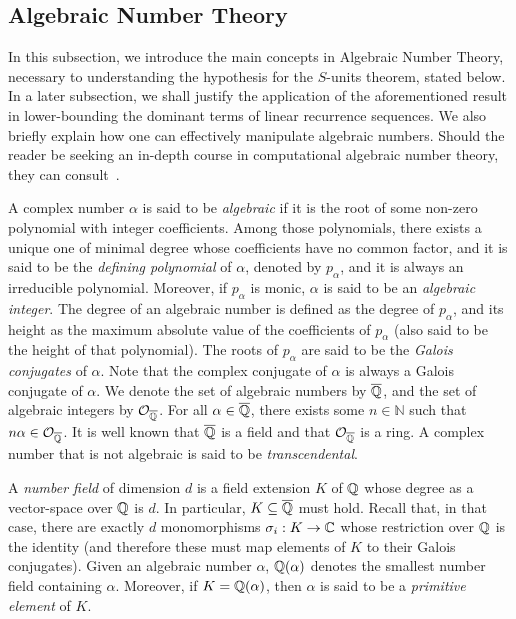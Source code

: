 
\subsection{Algebraic Number Theory}

In this subsection, we introduce the main concepts in Algebraic Number Theory, necessary to understanding the hypothesis for the $S$-units theorem, stated below. In a later subsection, we shall justify the application of the aforementioned result in lower-bounding the dominant terms of linear recurrence sequences. We also briefly explain how one can effectively manipulate algebraic numbers. Should the reader be seeking an in-depth course in computational algebraic number theory, they can consult~\cite{Cohen}.

A complex number $\alpha$ is said to be \emph{algebraic} if it is the root of some non-zero polynomial with integer coefficients. Among those polynomials, there exists a unique one of minimal degree whose coefficients have no common factor, and it is said to be the \emph{defining polynomial} of $\alpha$, denoted by $p_{\alpha}$, and it is always an irreducible polynomial. Moreover, if $p_{\alpha}$ is monic, $\alpha$ is said to be an \emph{algebraic integer}. The degree of an algebraic number is defined as the degree of $p_{\alpha}$, and its height as the maximum absolute value of the coefficients of $p_{\alpha}$ (also said to be the height of that polynomial). The roots of $p_{\alpha}$ are said to be the \emph{Galois conjugates} of $\alpha$. Note that the complex conjugate of $\alpha$ is always a Galois conjugate of $\alpha$.
We denote the set of algebraic numbers by $\overline{\mathbb{Q}}$, and the set of algebraic integers by $\mathcal{O}_{\overline{\mathbb{Q}}}$. For all $\alpha \in \overline{\mathbb{Q}}$, there exists some $n\in\mathbb{N}$ such that $n \alpha \in \mathcal{O}_{\overline{\mathbb{Q}}}$. It is well known that $\overline{\mathbb{Q}}$ is a field and that $\mathcal{O}_{\overline{\mathbb{Q}}}$ is a ring. A complex number that is not algebraic is said to be \emph{transcendental}.

A \emph{number field} of dimension $d$ is a field extension $K$ of $\mathbb{Q}$ whose degree as a vector-space over $\mathbb{Q}$ is $d$. In particular, $K\subseteq\overline{\mathbb{Q}}$ must hold.
Recall that, in that case, there are exactly $d$ monomorphisms $\sigma_{i} : K \rightarrow \mathbb{C}$ whose restriction over $\mathbb{Q}$ is the identity (and therefore these must map elements of $K$ to their Galois conjugates).
Given an algebraic number $\alpha$, $\mathbb{Q}(\alpha)$ denotes the smallest number field containing $\alpha$. Moreover, if $K=\mathbb{Q}(\alpha)$, then $\alpha$ is said to be a \emph{primitive element} of $K$.

